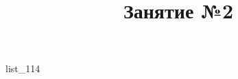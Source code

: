\documentclass[12pt, a4paper]{article}
\begin{document}
	\title{Занятие №2}
	{list_114}
\end{document}
